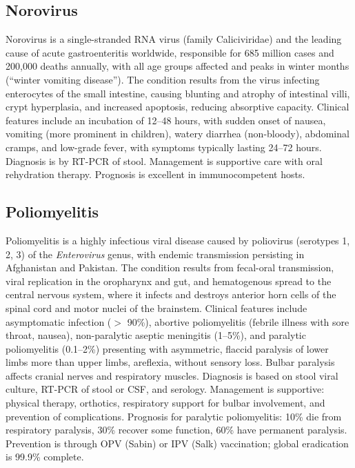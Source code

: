 \subsection{Norovirus}
\label{sec:Norovirus}
Norovirus is a single-stranded RNA virus (family Caliciviridae) and the leading cause of acute gastroenteritis worldwide, responsible for 685 million cases and 200,000 deaths annually, with all age groups affected and peaks in winter months (``winter vomiting disease''). The condition results from the virus infecting enterocytes of the small intestine, causing blunting and atrophy of intestinal villi, crypt hyperplasia, and increased apoptosis, reducing absorptive capacity. Clinical features include an incubation of 12--48 hours, with sudden onset of nausea, vomiting (more prominent in children), watery diarrhea (non-bloody), abdominal cramps, and low-grade fever, with symptoms typically lasting 24--72 hours. Diagnosis is by RT-PCR of stool. Management is supportive care with oral rehydration therapy. Prognosis is excellent in immunocompetent hosts.

\subsection{Poliomyelitis}
\label{sec:Poliomyelitis}
Poliomyelitis is a highly infectious viral disease caused by poliovirus (serotypes 1, 2, 3) of the \textit{Enterovirus} genus, with endemic transmission persisting in Afghanistan and Pakistan. The condition results from fecal-oral transmission, viral replication in the oropharynx and gut, and hematogenous spread to the central nervous system, where it infects and destroys anterior horn cells of the spinal cord and motor nuclei of the brainstem. Clinical features include asymptomatic infection ($>$ 90\%), abortive poliomyelitis (febrile illness with sore throat, nausea), non-paralytic aseptic meningitis (1--5\%), and paralytic poliomyelitis (0.1--2\%) presenting with asymmetric, flaccid paralysis of lower limbs more than upper limbs, areflexia, without sensory loss. Bulbar paralysis affects cranial nerves and respiratory muscles. Diagnosis is based on stool viral culture, RT-PCR of stool or CSF, and serology. Management is supportive: physical therapy, orthotics, respiratory support for bulbar involvement, and prevention of complications. Prognosis for paralytic poliomyelitis: 10\% die from respiratory paralysis, 30\% recover some function, 60\% have permanent paralysis. Prevention is through OPV (Sabin) or IPV (Salk) vaccination; global eradication is 99.9\% complete.


